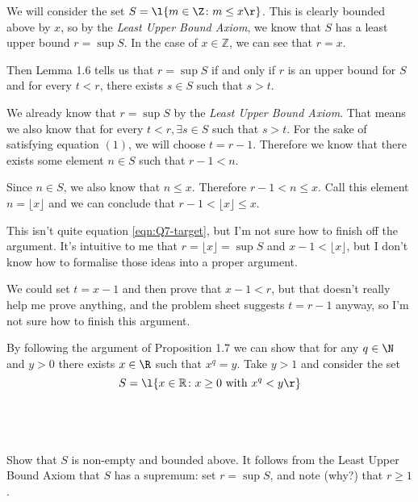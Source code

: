 \documentclass[a4paper]{article}
\begin{document}
We will consider the set $S = \l\{ m \in \Z \colon m \le x \r\}$. This is clearly bounded above by $x$, so by the \textit{Least Upper Bound Axiom}, we know that $S$ has a least upper bound $r = \sup S$. In the case of $x \in \mathbb Z$, we can see that $r = x$.

Then Lemma 1.6 tells us that $r = \sup S$ if and only if $r$ is an upper bound for $S$ and for every $t < r$, there exists $s \in S$ such that $s > t$.

We already know that $r = \sup S$ by the \textit{Least Upper Bound Axiom}. That means we also know that for every $t < r, \exists s \in S$ such that $s > t$. For the sake of satisfying equation $(1)$, we will choose $t = r - 1$. Therefore we know that there exists some element $n \in S$ such that $r - 1 < n$.

Since $n \in S$, we also know that $n \le x$. Therefore $r - 1 < n \le x$. Call this element $n = \lfloor x \rfloor$ and we can conclude that $r - 1 < \lfloor x \rfloor \le x$.

This isn't quite equation \eqref{eqn:Q7-target}, but I'm not sure how to finish off the argument. It's intuitive to me that $r = \lfloor x \rfloor = \sup S$ and $x - 1 < \lfloor x \rfloor$, but I don't know how to formalise those ideas into a proper argument.

We could set $t = x - 1$ and then prove that $x - 1 < r$, but that doesn't really help me prove anything, and the problem sheet suggests $t = r - 1$ anyway, so I'm not sure how to finish this argument.

\renewcommand{\thesubsection}{Q\arabic{section}~(\roman{subsection})}

\begin{questionbody}
By following the argument of Proposition 1.7 we can show that for any $q \in \N$ and $y > 0$ there exists $x \in \R$ such that $x^q = y$. Take $y > 1$ and consider the set
\[ S = \l\{ x \in \mathbb R \colon x \ge 0 \text{ with } x^q < y \r\} \]
\end{questionbody}

\subsection{~} %

\begin{questionbody}
Show that $S$ is non-empty and bounded above. It follows from the Least Upper Bound Axiom that $S$ has a supremum: set $r = \sup S$, and note (why?) that $r \ge 1$.
\end{questionbody}
\end{document}

